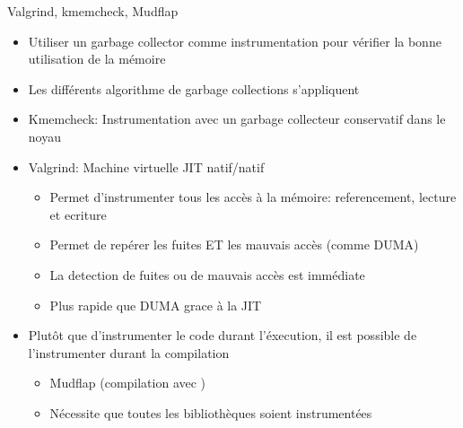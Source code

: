 \begin{frame}[fragile=singleslide]{Valgrind, kmemcheck, Mudflap}
  \begin{itemize} 
  \item  Utiliser  un  garbage  collector comme  instrumentation  pour
    vérifier la bonne utilisation de la mémoire
  \item Les différents algorithme de garbage collections s'appliquent
  \item   Kmemcheck:  Instrumentation   avec  un   garbage  collecteur
    conservatif dans le noyau
  \item Valgrind: Machine virtuelle JIT natif/natif
    \begin{itemize} 
    \item  Permet   d'instrumenter  tous  les  accès   à  la  mémoire:
      referencement, lecture et ecriture
    \item Permet de repérer les fuites ET les mauvais accès (comme DUMA)
    \item La detection de fuites ou de mauvais accès est immédiate
    \item Plus rapide que DUMA grace à la JIT
    \end{itemize} 
  \item Plutôt  que d'instrumenter le code durant  l'éxecution, il est
    possible de l'instrumenter durant la compilation
    \begin{itemize} 
    \item Mudflap (compilation avec )
    \item Nécessite que toutes les bibliothèques soient instrumentées
    \end{itemize}
  \end{itemize}
\end{frame} 

